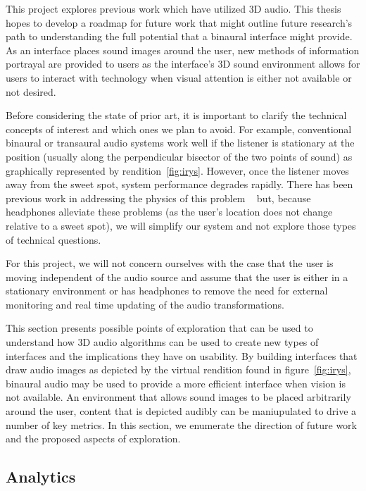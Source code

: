 This project explores previous work which have utilized 3D audio.  This thesis
hopes to develop a roadmap for future work that might outline future research's
path to understanding the full potential that a binaural interface might provide. 
As an interface places sound images around the user, new methods of information 
portrayal are provided to users as the interface's 3D sound environment allows
for users to interact with technology when visual attention is either not 
available or not desired.

Before considering the state of prior art, it is important to clarify the technical
concepts of interest and which ones we plan to avoid. For example, conventional binaural or
transaural audio systems work well if the listener is stationary at the position
(usually along the perpendicular bisector of the two points of sound) as 
graphically represented by rendition~\ref{fig:irys}. However, once the listener
moves away from the sweet spot, system performance degrades rapidly. There has
been previous work in addressing the physics of this problem ~\cite{song2010personal}
but, because headphones alleviate these problems (as the user's location does not
change relative to a sweet spot), we will simplify our system and not explore those
types of technical questions.

For this project, we will not concern ourselves with the case that the user is
moving independent of the audio source and assume that the user is either in a
stationary environment or has headphones to remove the need for external
monitoring and real time updating of the audio transformations.

This section presents possible points of exploration that can be used to understand
how 3D audio algorithms can be used to create new types of interfaces and the 
implications they have on usability. By building interfaces that draw audio images 
as depicted by the virtual rendition found in figure~\ref{fig:irys}, binaural audio
may be used to provide a more efficient interface when vision is not available. 
An environment that allows sound images to be placed arbitrarily around the user,
content that is depicted audibly can be maniupulated to drive a number of key 
metrics. In this section, we enumerate the direction of future work and the 
proposed aspects of exploration.

\subsection{                  Analytics                                      }

